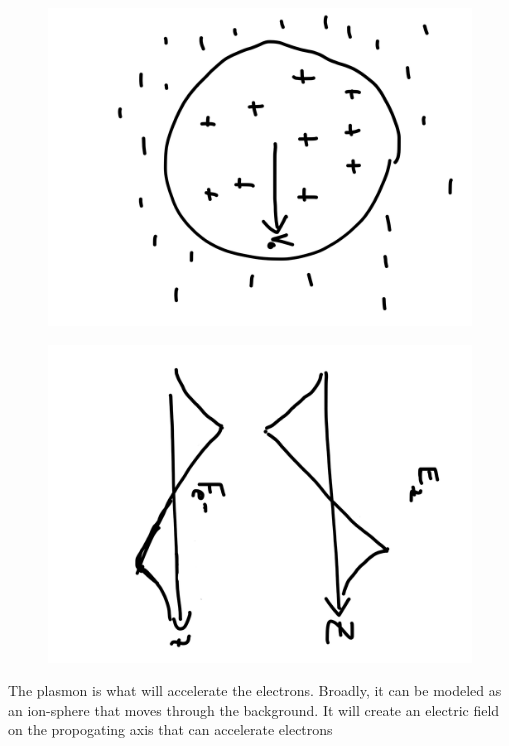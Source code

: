 \documentclass[12pt,letterpaper, titlepage]{article}
\begin{document}
\begin{marginfigure}
    \centering
    \begin{subfigure}[t]{\marginparwidth}
        \includegraphics[angle=90,width=\linewidth]{../figures/ioncav.png}
\end{subfigure}

	\begin{subfigure}[b]{\marginparwidth}
	\includegraphics[angle=90,width=\linewidth]{../figures/ioncav2.png}
	\end{subfigure}
    \caption{The plasmon is what will accelerate the electrons. Broadly, it 
    can be modeled as an ion-sphere that moves through the background. It will
    create an electric field on the propogating axis that can accelerate
electrons}
	\end{marginfigure}
\end{document}
